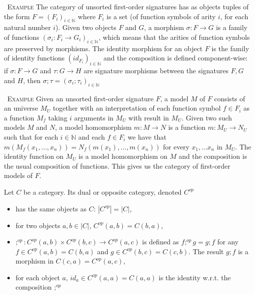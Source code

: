 \documentclass[10pt,fleqn,final]{scrreprt}
\newenvironment{example}[0]{\ \newline \textsc{Example}\quad }{}
\begin{document}
\begin{example}
 The category of unsorted first-order signatures has as objects tuples of the form
 $F = (F_i)_{i\in \mathbb{N}}$ 
 where $F_i$ is a set (of function symbols of arity $i$, for 
 each natural number $i$). Given two objects $F$ and $G$, a morphism
 $\sigma: F \to G$ is a family of functions $(\sigma_i:F_i\to G_i)_{i\in\mathbb{N}}$, 
 which means that the arities of function symbols are preserved by morphisms.
 The identity morphism for an object $F$ is the family of identity functions
 $(id_{F_i})_{i\in\mathbb{N}}$ and the composition is defined component-wise:
 if $\sigma:F \to G$ and $\tau:G \to H$ are signature morphisms between the signatures
 $F, G$ and $H$, then
 $\sigma;\tau = (\sigma_i;\tau_i)_{i\in\mathbb{N}}$
\end{example}

\begin{example}
 Given an unsorted first-order signature $F$, a model $M$ of $F$ consists of an 
 universe $M_U$ together with an interpretation of each function symbol
 $f \in F_i$ as a function $M_f$ taking $i$ arguments in $M_U$ with result in $M_U$. 
 Given two such models $M$ and $N$, a model homomorphism $m : M \to N$
 is a function $m: M_U \to N_U$ such that for each $i\in \mathbb{N}$ and each
 $f\in F_i$ we have that $m(M_f(x_1,\ldots, x_n)) = N_f(m(x_1), \ldots, m(x_n))$ for
 every $x_1,\ldots x_n$ in $M_U$. The identity function on $M_U$ is a model homomorphism
 on $M$ and the composition is  the usual composition of functions. This gives us the
 category of first-order models of $F$.
\end{example}

\begin{definition}
Let $C$ be a category. Its dual or opposite category, denoted $C^{op}$ 
\begin{itemize}
\item has the same 
objects as $C$: $|C^{op}| = |C|$,
\item for two objects $a,b\in |C|$, $C^{op}(a,b) = C(b,a)$,
\item $;^{op} : C^{op}(a,b) \times C^{op}(b,c) \to C^{op}(a,c)$ is defined as
$f;^{op} g = g;f$ for any $f\in C^{op}(a,b) = C(b,a)$ and $g\in C^{op}(b,c) = C(c,b)$.
The result $g;f$ is a morphism in $C(c,a) = C^{op}(a,c)$,
\item for each object $a$, $id_a \in C^{op}(a,a) = C(a,a)$ is the identity w.r.t. the composition $;^{op}$
\end{itemize}
\end{definition}
\end{document}
